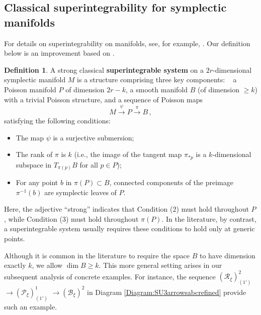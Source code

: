 \documentclass[12pt]{amsart}
\theoremstyle{definition}
\newtheorem{definition}[theorem]{Definition}
\numberwithin{equation}{section}
\newcommand{\Reducedxi}{\mathcal{R}_\xi}
\newcommand{\Pxi}{\mathcal{P}_{\xi}}
\newcommand{\Bxi}{\mathcal{B}_{\xi}}
\begin{document}
\subsection{Classical superintegrability for symplectic manifolds}\label{Sec:sub-classicalsuperint}
For details on superintegrability on manifolds, see,  for example, 
\cite{Old-review,Nek1972,NR2003}. Our definition below is an improvement based on \cite{NR2003}.
 \begin{definition}\label{Def:superint3}  A strong classical  \textbf{superintegrable system}   on a $2r$-dimensional symplectic manifold $M $ 
 is a structure comprising three key components:  ~ a Poisson manifold $P $ of dimension ${2r-k}$, a smooth manifold $B$ (of dimension   $\geqslant k$)  with a trivial Poisson structure, and a sequence of   Poisson maps 
	\begin{equation}\label{Seq:generalMPB}
		M  \overset{\psi}{\longrightarrow} P  \overset{\pi}{\longrightarrow} B  \,,
	\end{equation}
satisfying the following conditions:
\begin{itemize}
  \item[(1)] The map  $\psi$ is a surjective  submersion; 
  \item[(2)]  The rank of $\pi$ is $k$ (i.e., the image of the tangent map $\pi_{*p}$ is a $k$-dimensional subspace in $T_{\pi(p)}B$ for all $p\in P $);
  \item[(3)] For any point  $b$ in $\pi(P )\subset B$, connected components of the preimage $\pi^{-1}(b)$   are symplectic leaves of $P $. 
\end{itemize}
	
\end{definition} 

Here, the adjective ``strong'' indicates that Condition (2) must hold throughout \(P\), while Condition (3) must hold throughout \(\pi(P)\). In the literature, by contrast, a superintegrable system usually requires these conditions to hold only at generic points.
 
Although it is common in the literature to require the space $B$ to have dimension exactly $k$, we allow $\dim B \geqslant k$. This more general setting arises in our subsequent analysis of concrete examples. For instance, the sequence  $(\Reducedxi)^2_{(1')}$  $\to (\Pxi)^1_{(1')}$  $\to (\Bxi)^2$ in Diagram \eqref{Diagram:SU3arrowsabcrefined} provide such an example. 
 
\end{document}
